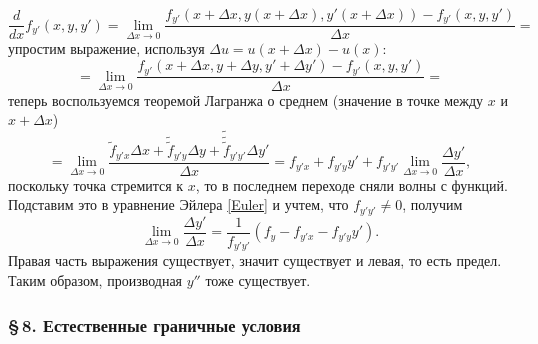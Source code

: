 \documentclass[12pt,a5paper]{book}
\begin{document}
	\begin{equation*}
		\frac{d}{dx}f_{y'}(x,y,y') = \lim_{\Delta x \rightarrow 0} \frac{f_{y'}(x+\Delta x, y(x+\Delta x), y'(x+\Delta x)) - f_{y'}(x,y,y')}{\Delta x} =
	\end{equation*}
	упростим выражение, используя $\Delta u = u(x + \Delta x) - u(x)$:
	\begin{equation*}
		= \lim_{\Delta x \rightarrow 0} \frac{f_{y'}(x + \Delta x, y + \Delta y, y' + \Delta y') - f_{y'}(x,y,y')}{\Delta x} =
	\end{equation*}
	теперь воспользуемся теоремой Лагранжа о среднем (значение в точке между $x$ и $x + \Delta x$)
	\begin{equation*}
		= \lim_{\Delta x \rightarrow 0} \frac{\tilde{f}_{y'x}\Delta x + \tilde{\tilde{f}}_{y'y}\Delta y + \tilde{\tilde{\tilde{f}}}_{y'y'}\Delta y'}{\Delta x} = f_{y'x} + f_{y'y}y' + f_{y'y'}\lim_{\Delta x \rightarrow 0} \frac{\Delta y'}{\Delta x},
	\end{equation*}
	поскольку точка стремится к $x$, то в последнем переходе сняли волны с функций. Подставим это в уравнение Эйлера \eqref{Euler} и учтем, что $f_{y'y'} \neq 0$, получим
	\begin{equation*}
		\lim_{\Delta x \rightarrow 0} \frac{\Delta y'}{\Delta x} = \frac{1}{f_{y'y'}}\left(f_y - f_{y'x} - f_{y'y}y'\right).
	\end{equation*}
	Правая часть выражения существует, значит существует и левая, то есть предел. Таким образом, производная $y''$ тоже существует.
	
	\subsubsection*{\S\,8. Естественные граничные условия}
	
\end{document}
